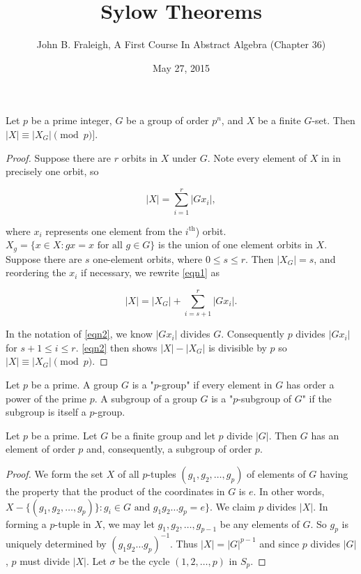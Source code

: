 \documentclass[a4paper,11pt]{article}
\title{Sylow Theorems}
\author{John B. Fraleigh, A First Course In Abstract Algebra (Chapter 36)}
\date{May 27, 2015}
\begin{document}
\maketitle
{}

\begin{outline}

    Let \(p\) be a prime integer, \(G\) be a group of order \(p^n\), and \(X\) be a finite \(G\)-set. Then 
    \(|X| \equiv |X_G| \pmod{p}]\).
    
    \begin{proof}
      Suppose there are \(r\) orbits in \(X\) under \(G\). Note every element of \(X\) in in precisely one orbit, so
      
      \begin{equation}
        \label{eqn1}
        |X| = \sum_{i=1}^{r} |Gx_i|, 
      \end{equation}
      
      where \(x_i\) represents one element from the \(i^{\text{th}}\)) orbit. \(X_{g} = \{x \in X: gx = x \text{ for all }
      g \in G\}\) is the union of one element orbits in \(X\). Suppose there are \(s\) one-element orbits, where \(0 \leq
      s \leq r\). Then \(|X_G| = s\), and reordering the \(x_i\) if necessary, we rewrite \eqref{eqn1} as 
      
      \begin{equation}
        \label{eqn2}
        |X| = |X_G| + \sum_{i=s+1}^r |Gx_i|.
      \end{equation}
      
      In the notation of \eqref{eqn2}, we know \(|Gx_i|\) divides \(G\). Consequently \(p\) divides \(|Gx_i|\) for
      \(s + 1 \leq i \leq r\). \eqref{eqn2} then shows \(|X| - |X_G|\) is divisible by \(p\) so \(|X| \equiv |X_G|
      \pmod{p}\).
    \end{proof}

    Let \(p\) be a prime. A group \(G\) is a "\(p\)-group" if every element in \(G\) has order a power
    of the prime \(p\). A subgroup of a group \(G\) is a "\(p\)-subgroup of \(G\)" if the subgroup is 
    itself a \(p\)-group.

    Let \(p\) be a prime. Let \(G\) be a finite group and let \(p\) divide \(|G|\). Then \(G\) has an 
    element of order \(p\) and, consequently, a subgroup of order \(p\).
    
    \begin{proof}
      We form the set \(X\) of all \(p\)-tuples \((g_1, g_2, \ldots, g_p)\) of elements of \(G\) having the property that
      the product of the coordinates in \(G\) is \(e\). In other words, \(X - \{(g_1, g_2, \ldots, g_p)\}: g_i \in G 
      \text{ and } g_1g_2\ldots g_p = e\}\). We claim \(p\) divides \(|X|\). In forming a \(p\)-tuple in \(X\), we may
      let \(g_1, g_2, \ldots, g_{p-1}\) be any elements of \(G\). So \(g_p\) is uniquely determined by \((g_1g_2 \ldots 
      g_p)^{-1}\). Thus \(|X| = |G|^{p-1}\) and since \(p\) divides \(|G|\), \(p\) must divide \(|X|\). Let \(\sigma\)
      be the cycle \((1, 2, \ldots, p)\) in \(S_p\).
      

\end{proof}
\end{outline}
\end{document}
